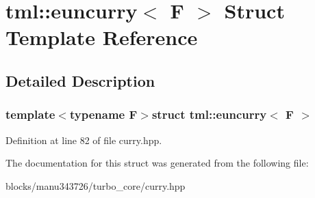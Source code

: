 \hypertarget{structtml_1_1euncurry}{\section{tml\+:\+:euncurry$<$ F $>$ Struct Template Reference}
\label{structtml_1_1euncurry}
}


\subsection{Detailed Description}
\subsubsection*{template$<$typename F$>$struct tml\+::euncurry$<$ F $>$}



Definition at line 82 of file curry.\+hpp.



The documentation for this struct was generated from the following file\+:\begin{DoxyCompactItemize}
\item 
blocks/manu343726/turbo\+\_\+core/curry.\+hpp\end{DoxyCompactItemize}
